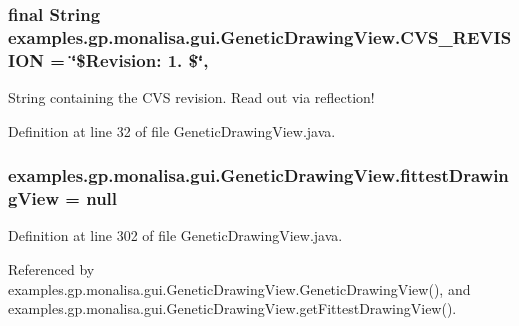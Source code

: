\hypertarget{classexamples_1_1gp_1_1monalisa_1_1gui_1_1_genetic_drawing_view_ac401f8c2147b78c1cca1391b5bcac9cc}{
\subsubsection[{C\-V\-S\-\_\-\-R\-E\-V\-I\-S\-I\-O\-N}]{\setlength{\rightskip}{0pt plus 5cm}final String examples.\-gp.\-monalisa.\-gui.\-Genetic\-Drawing\-View.\-C\-V\-S\-\_\-\-R\-E\-V\-I\-S\-I\-O\-N = \char`\"{}\$Revision\-: 1. \$\char`\"{}\hspace{0.3cm}{\ttfamily [static]}, {\ttfamily [private]}}}\label{classexamples_1_1gp_1_1monalisa_1_1gui_1_1_genetic_drawing_view_ac401f8c2147b78c1cca1391b5bcac9cc}
String containing the C\-V\-S revision. Read out via reflection! 

Definition at line 32 of file Genetic\-Drawing\-View.\-java.

\hypertarget{classexamples_1_1gp_1_1monalisa_1_1gui_1_1_genetic_drawing_view_ac0e9a3db24cb6440790d5ae93af89283}{
\subsubsection[{fittest\-Drawing\-View}]{ examples.\-gp.\-monalisa.\-gui.\-Genetic\-Drawing\-View.\-fittest\-Drawing\-View = null\hspace{0.3cm}{\ttfamily [private]}}}\label{classexamples_1_1gp_1_1monalisa_1_1gui_1_1_genetic_drawing_view_ac0e9a3db24cb6440790d5ae93af89283}


Definition at line 302 of file Genetic\-Drawing\-View.\-java.



Referenced by examples.\-gp.\-monalisa.\-gui.\-Genetic\-Drawing\-View.\-Genetic\-Drawing\-View(), and examples.\-gp.\-monalisa.\-gui.\-Genetic\-Drawing\-View.\-get\-Fittest\-Drawing\-View().

